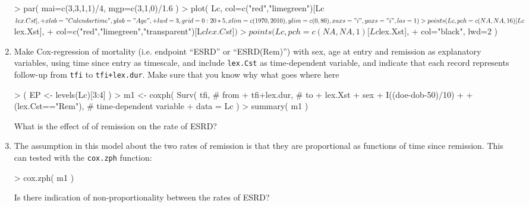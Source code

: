 \begin{enumerate}
\begin{Schunk}
\begin{Sinput}
> par( mai=c(3,3,1,1)/4, mgp=c(3,1,0)/1.6 )
> plot( Lc, col=c("red","limegreen")[Lc$lex.Cst],
+       xlab="Calendar time", ylab="Age",
+       lwd=3, grid=0:20*5, xlim=c(1970,2010), ylim=c(0,80), xaxs="i", yaxs="i", las=1 )
> points( Lc, pch=c(NA,NA,16)[Lc$lex.Xst],
+             col=c("red","limegreen","transparent")[Lc$lex.Cst])
> points( Lc, pch=c(NA,NA,1)[Lc$lex.Xst],
+             col="black", lwd=2 )
\end{Sinput}
\end{Schunk}
\item Make Cox-regression of mortality (i.e. endpoint ``ESRD'' or ``ESRD(Rem)'') with
  sex, age at entry and remission as explanatory variables, using time
  since entry as timescale, and include \texttt{lex.Cst} as
  time-dependent variable, and indicate that each record represents
  follow-up from \texttt{tfi} to \texttt{tfi+lex.dur}. Make sure that
  you know why what goes where here 
\begin{Schunk}
\begin{Sinput}
> ( EP <- levels(Lc)[3:4] )
> m1 <- coxph( Surv( tfi,                  # from
+                    tfi+lex.dur,          # to
+                    lex.Xst %in% EP ) ~   # event
+              sex + I((doe-dob-50)/10) + 
+              (lex.Cst=="Rem"),           # time-dependent variable 
+              data = Lc )
> summary( m1 )
\end{Sinput}
\end{Schunk}
What is the effect of of remission on the rate of ESRD? 
\item The assumption in this model about the two rates of remission is
  that they are proportional as functions of time since
  remission. This can tested with the \texttt{cox.zph} function:
\begin{Schunk}
\begin{Sinput}
> cox.zph( m1 )
\end{Sinput}
\end{Schunk}
 Is there indication of non-proportionality between the rates of ESRD?
\end{enumerate}
